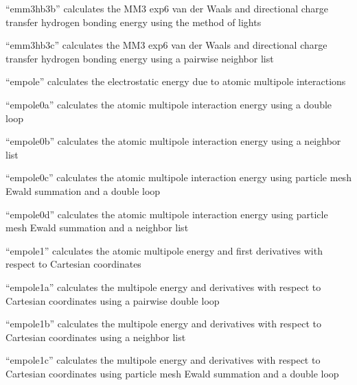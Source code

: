 \documentclass[letterpaper,11pt,english]{sphinxmanual}
\begin{document}
“emm3hb3b” calculates the MM3 exp\sphinxhyphen{}6 van der Waals and
directional charge transfer hydrogen bonding energy using
the method of lights


“emm3hb3c” calculates the MM3 exp\sphinxhyphen{}6 van der Waals and
directional charge transfer hydrogen bonding energy using
a pairwise neighbor list


“empole” calculates the electrostatic energy due to atomic
multipole interactions


“empole0a” calculates the atomic multipole interaction energy
using a double loop


“empole0b” calculates the atomic multipole interaction energy
using a neighbor list


“empole0c” calculates the atomic multipole interaction energy
using particle mesh Ewald summation and a double loop


“empole0d” calculates the atomic multipole interaction energy
using particle mesh Ewald summation and a neighbor list


“empole1” calculates the atomic multipole energy and first
derivatives with respect to Cartesian coordinates


“empole1a” calculates the multipole energy and derivatives with
respect to Cartesian coordinates using a pairwise double loop


“empole1b” calculates the multipole energy and derivatives
with respect to Cartesian coordinates using a neighbor list


“empole1c” calculates the multipole energy and derivatives
with respect to Cartesian coordinates using particle mesh
Ewald summation and a double loop

\end{document}
